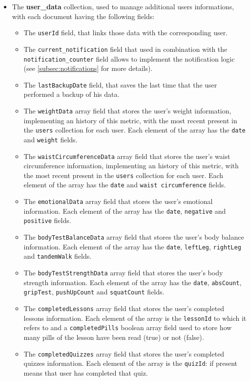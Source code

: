 \begin{itemize}[nosep] %
    \item The \textbf{user\_data} collection, used to manage additional users informations, with each document having the following fields:
    \begin{itemize}[nosep]
        \item The \texttt{userId} field, that links those data with the corresponding user.
        \item The \texttt{current\_notification} field that used in combination with the \newline \texttt{notification\_counter} field allows to implement the notification logic (see \cref{subsec:notifications} for more details).
        \item The \texttt{lastBackupDate} field, that saves the last time that the user performed a backup of his data.
        \item The \texttt{weightData} array field that stores the user's weight information, implementing an history of this metric, with the most recent present in the \texttt{users} collection for each user. Each element of the array has the \texttt{date} and \texttt{weight} fields.    
        \item The \texttt{waistCircumferenceData} array field that stores the user's waist circumference information, implementing an history of this metric, with the most recent present in the \texttt{users} collection for each user. Each element of the array has the \texttt{date} and \texttt{waist circumference} fields.
        \item The \texttt{emotionalData} array field that stores the user's emotional information. Each element of the array has the \texttt{date}, \texttt{negative} and \texttt{positive} fields.
        \item The \texttt{bodyTestBalanceData} array field that stores the user's body balance information. Each element of the array has the \texttt{date}, \texttt{leftLeg}, \texttt{rightLeg} and \texttt{tandemWalk} fields.
        \item The \texttt{bodyTestStrengthData} array field that stores the user's body strength information. Each element of the array has the \texttt{date}, \texttt{absCount}, \texttt{gripTest}, \texttt{pushUpCount} and \texttt{squatCount} fields.
        \label{subsubsec:completedPills}
        \item The \texttt{completedLessons} array field that stores the user's completed lessons information. Each element of the array is the \texttt{lessonId} to which it refers to and a \texttt{completedPills} boolean array field used to store how many pills of the lesson have been read (true) or not (false).
        \item The \texttt{completedQuizzes} array field that stores the user's completed quizzes information. Each element of the array is the \texttt{quizId}: if present means that user has completed that quiz.
    \end{itemize}
\end{itemize}

